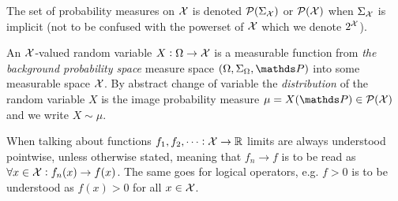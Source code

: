 The set of probability measures on $\mathcal{X}$ is denoted
$\mathcal{P}(\Sigma_\mathcal{X})$ or $\mathcal{P}(\mathcal{X})$ when $\Sigma_\mathcal{X}$ is implicit
(not to be confused with the powerset of $\mathcal{X}$
which we denote $2^{\mathcal{X}}$).

An $\mathcal{X}$-valued random variable $X : \Omega \to \mathcal{X}$ is a
measurable function from \emph{the background probability space}
measure space $(\Omega, \Sigma_\Omega, \Prob)$ into some measurable
space $\mathcal{X}$.
By abstract change of variable the \emph{distribution} of the random variable $X$
is the image probability measure $\mu = X(\Prob) \in \cl{P}(\cl{X})$
and we write $X \sim \mu$.

When talking about functions $f_1, f_2, \dots : \mathcal{X} \to \mathbb{R}$
limits are always understood pointwise, unless otherwise stated,
meaning that $f_n \to f$ is to be read as
$\forall x \in \mathcal{X} : f_n(x) \to f(x)$.
The same goes for logical operators, e.g. $f > 0$ is to be understood
as $f(x) > 0$ for all $x \in \mathcal{X}$.


